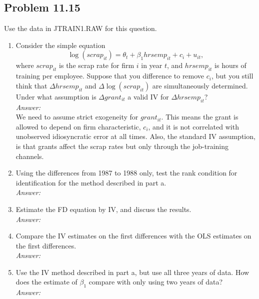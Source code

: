 \documentclass[10pt]{article}
\begin{document}
\subsection*{Problem 11.15}
Use the data in JTRAIN1.RAW for this question.
\begin{enumerate}[label=\alph*.]
\item Consider the simple equation \[\log(scrap_{it})=\theta_t+\beta_1hrsemp_{it}+c_i+u_{it},\] where $scrap_{it}$ is the scrap rate for firm $i$ in year $t$, and $hrsemp_{it}$ is hours of training per employee. Suppose that you difference to remove $c_i$, but you still think that $\Delta hrsemp_{it}$ and $\Delta \log(scrap_{it})$ are simultaneously determined. Under what assumption is $\Delta grant_{it}$ a valid IV for $\Delta hrsemp_{it}$?
\\ \textit{Answer:}\\
We need to assume strict exogeneity for $grant_{it}.$ This means the grant is allowed to depend on firm characteristic, $c_i$, and it is not correlated with unobserved idiosyncratic error at all times. Also, the standard IV assumption, is that grants affect the scrap rates but only through the job-training channels.

\item Using the differences from 1987 to 1988 only, test the rank condition for identification for the method described in part a.
\\ \textit{Answer:}\\


\item Estimate the FD equation by IV, and discuss the results.
\\\textit{Answer:}\\


\item Compare the IV estimates on the first differences with the OLS estimates on the first differences.
\\\textit{Answer:}\\


\item Use the IV method described in part a, but use all three years of data. How does the estimate of $\beta_1$ compare with only using two years of data? 
\\\textit{Answer:}\\


\end{enumerate}
\end{document}

